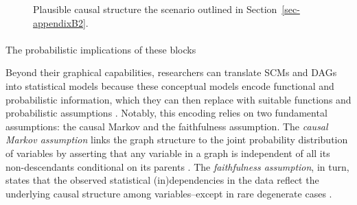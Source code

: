 \documentclass[
  authoryear,
  review,
  1p]{elsarticle}
\makeatletter
\let\oldparagraph\paragraph
\renewcommand{\paragraph}{
    \@ifstar
      \xxxParagraphStar
      \xxxParagraphNoStar
  }
\newcommand{\xxxParagraphStar}[1]{\oldparagraph*{#1}\mbox{}}
\newcommand{\xxxParagraphNoStar}[1]{\oldparagraph{#1}\mbox{}}
\makeatother
\begin{document}
\begin{figure}

\begin{minipage}{0.50\linewidth}

\centering{

\[
\begin{aligned}
  X & := f_{X}(e_{X}) \\
  T & := f_{T}(X,e_{T}) \\
  Y & := f_{Y}(T,X,e_{Y}) \\
  e_{T} & \:\bot\:e_{X} \\
  e_{T} & \:\bot\:e_{Y} \\
  e_{X} & \:\bot\:e_{Y}
\end{aligned}
\]

}


\end{minipage}%
%
\begin{minipage}{0.50\linewidth}



\end{minipage}%

\caption{\label{fig-example1}Plausible causal structure the scenario
outlined in Section~\ref{sec-appendixB2}.}

\end{figure}%

\paragraph{The probabilistic implications of these
blocks}\label{sec-appendixB32}

Beyond their graphical capabilities, researchers can translate SCMs and
DAGs into statistical models because these conceptual models encode
functional and probabilistic information, which they can then replace
with suitable functions and probabilistic assumptions
\citep{Pearl_et_al_2016}. Notably, this encoding relies on two
fundamental assumptions: the causal Markov and the faithfulness
assumption. The \emph{causal Markov assumption} links the graph
structure to the joint probability distribution of variables by
asserting that any variable in a graph is independent of all its
non-descendants conditional on its parents
\citetext{\citealp[p.~20]{Neal_2020}; \citealp[p.~80]{Hernan_et_al_2025}}.
The \emph{faithfulness assumption}, in turn, states that the observed
statistical (in)dependencies in the data reflect the underlying causal
structure among variables--except in rare degenerate cases
\citetext{\citealp[p.~100]{Neal_2020}; \citealp[p.~81]{Hernan_et_al_2025}}.
\end{document}
